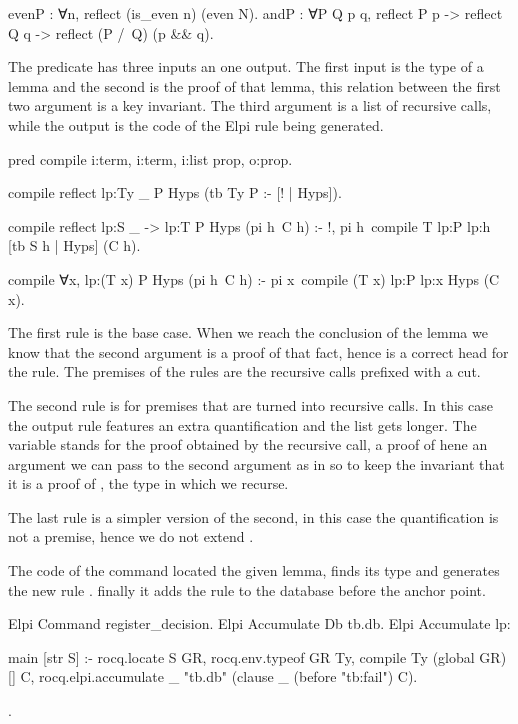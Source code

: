 \documentclass[a4paper, 11pt]{book}
\begin{document}
\begin{rocqcode}
evenP : ∀n, reflect (is_even n) (even N).
andP : ∀P Q p q,
  reflect P p -> reflect Q q -> reflect (P /\ Q) (p && q).
\end{rocqcode}

The  predicate has three inputs an one output.
The first input is the type of a lemma and the second is the proof of that
lemma, this relation between the first two argument is a key invariant.
The third argument is a list of recursive calls, while the output is
the code of the Elpi rule being generated.

\begin{elpicode}
pred compile i:term, i:term, i:list prop, o:prop.

compile {{ reflect lp:Ty _ }} P Hyps (tb Ty P :- [! | Hyps]).

compile {{ reflect lp:S _ -> lp:T }} P Hyps (pi h\ C h) :- !,
  pi h\ compile T {{ lp:P lp:h }} [tb S h | Hyps] (C h).

compile {{ ∀x, lp:(T x) }} P Hyps (pi h\ C h) :-
  pi x\ compile (T x) {{ lp:P lp:x }} Hyps (C x).
\end{elpicode}

The first rule is the base case. When we reach the conclusion of the lemma
 we know that the second argument 
is a proof of that fact, hence  is a correct head for the
rule. The premises of the rules are the  recursive calls
prefixed with a cut.

The second rule is for premises that are turned into recursive calls. In this
case the output rule features an extra  quantification and the
 list gets longer. The  variable stands for
the proof obtained by the recursive call, a proof of 
hene an argument we can pass to the second argument as in 
so to keep the invariant that it is a proof of , the type
in which we recurse.

The last rule is a simpler version of the second, in this case the quantification
is not a premise, hence we do not extend .

The code of the  command located the
given lemma, finds its type and generates the new rule .
finally it adds the rule to the database before the 
anchor point.

\begin{rocqcode}
Elpi Command register_decision.
Elpi Accumulate Db tb.db.
Elpi Accumulate lp:{{
    
main [str S] :-
  rocq.locate S GR,
  rocq.env.typeof GR Ty,
  compile Ty (global GR) [] C,
  rocq.elpi.accumulate _ "tb.db" (clause _ (before "tb:fail") C).

}}.
\end{rocqcode}
\end{document}

